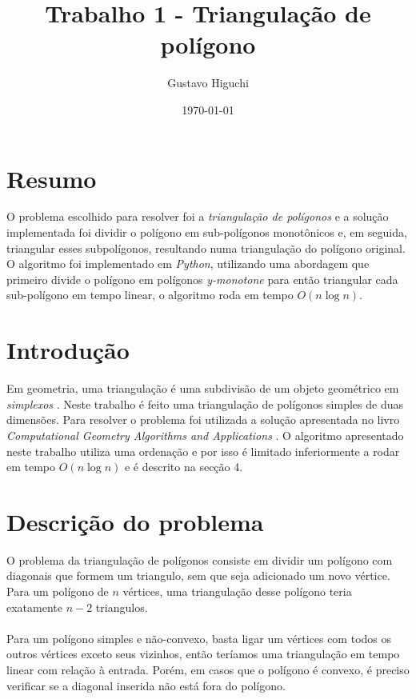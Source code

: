 \documentclass{article}
\title{Trabalho 1 - Triangulação de polígono}
\author{Gustavo Higuchi}
\date{\today}
\begin{document}
\maketitle
\newpage
\tableofcontents
\newpage
\section{Resumo}
\hspace*{15pt}O problema escolhido para resolver foi a \textit{triangulação de polígonos} e a
solução implementada foi dividir o polígono em sub-polígonos monotônicos e,
em seguida, triangular esses subpolígonos, resultando numa triangulação do polígono
original. O algoritmo foi implementado em \textit{Python}, utilizando uma abordagem
que primeiro divide o polígono em polígonos \textit{y-monotone} para então
triangular cada sub-polígono em tempo linear, o algoritmo roda em tempo $O(n\log n)$.

\section{Introdução}
\hspace*{15pt}Em geometria, uma triangulação é uma subdivisão de um objeto geométrico em
\textit{simplexos} \cite{wikiTriang}. Neste trabalho é feito uma triangulação
de polígonos simples de duas dimensões. Para resolver o problema foi utilizada
a solução apresentada no livro \textit{Computational Geometry Algorithms and Applications}
\cite{bergBook}. O algoritmo apresentado neste trabalho utiliza uma ordenação e
por isso é limitado inferiormente a rodar em tempo $O(n \log n)$ e é descrito
na secção 4.

\section{Descrição do problema}
\hspace*{15pt}O problema da triangulação de polígonos consiste em dividir um polígono com diagonais
que formem um triangulo, sem que seja adicionado um novo vértice.
Para um polígono de $n$ vértices, uma triangulação desse polígono teria exatamente
$n-2$ triangulos.\\
\\
\hspace*{15pt}Para um polígono simples e não-convexo, basta ligar um vértices com todos os
outros vértices exceto seus vizinhos, então teríamos uma triangulação em tempo
linear com relação à entrada. Porém, em casos que o polígono é convexo, é preciso
verificar se a diagonal inserida não está fora do polígono.\\
\\
\end{document}

